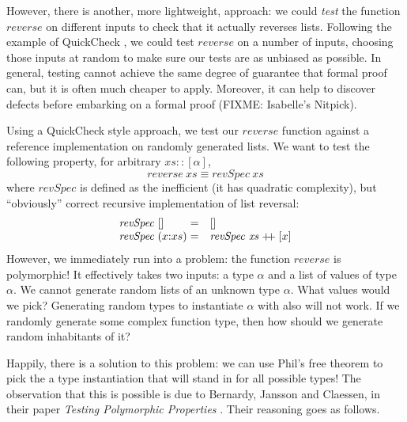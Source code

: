 \documentclass{llncs}
\newcommand{\listappend}{\mathrel{+\kern-3pt+}}
\begin{document}
However, there is another, more lightweight, approach: we could
\emph{test} the function $\mathit{reverse}$ on different inputs to
check that it actually reverses lists. Following the example of
QuickCheck \cite{DBLP:conf/icfp/ClaessenH00}, we could test
$\mathit{reverse}$ on a number of inputs, choosing those inputs at
random to make sure our tests are as unbiased as possible. In general,
testing cannot achieve the same degree of guarantee that formal proof
can, but it is often much cheaper to apply. Moreover, it can help to
discover defects before embarking on a formal proof (FIXME: Isabelle's
Nitpick).

Using a QuickCheck style approach, we test our $\mathit{reverse}$
function against a reference implementation on randomly generated
lists. We want to test the following property, for arbitrary
$\mathit{xs} :: [\alpha]$,
\begin{equation}\label{eq:reverse-test}
  \mathit{reverse}~\mathit{xs} \equiv \mathit{revSpec}~\mathit{xs}
\end{equation}
where $\mathit{revSpec}$ is defined as the inefficient (it has
quadratic complexity), but ``obviously'' correct recursive
implementation of list reversal:
\begin{displaymath}
  \begin{array}{l@{\hspace{0.3em}}l@{\hspace{0.3em}}cl}
    \mathit{revSpec}& [] & = & [] \\
    \mathit{revSpec}& (x\mathord:xs) & = & \mathit{revSpec}~\mathit{xs} \listappend [x]
  \end{array}
\end{displaymath}
However, we immediately run into a problem: the function
$\mathit{reverse}$ is polymorphic! It effectively takes two inputs: a
type $\alpha$ and a list of values of type $\alpha$. We cannot
generate random lists of an unknown type $\alpha$. What values would
we pick? Generating random types to instantiate $\alpha$ with also
will not work. If we randomly generate some complex function type,
then how should we generate random inhabitants of it?

Happily, there is a solution to this problem: we can use Phil's free
theorem to pick the a type instantiation that will stand in for all
possible types! The observation that this is possible is due to
Bernardy, Jansson and Claessen, in their paper \emph{Testing
  Polymorphic Properties} \cite{DBLP:conf/esop/BernardyJC10}. Their
reasoning goes as follows.
\end{document}
